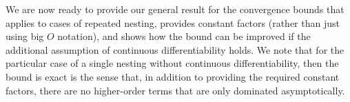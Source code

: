 We are now ready to provide our general result for the convergence bounds that applies to cases of
repeated nesting, provides constant factors (rather than just using big $O$ notation), and
shows how the bound can be improved if the additional assumption of continuous differentiability holds.
We note that for the particular case of a single nesting without continuous differentiability,
then the bound is exact is the sense that, in addition to providing the required constant factors,
there are no higher-order terms that are only dominated asymptotically.
\vspace{-5pt}
